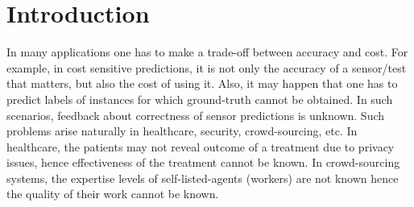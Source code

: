 \section{Introduction}
In many applications one has to make a trade-off between accuracy and cost. For example, in cost sensitive predictions, it is not only the accuracy of a sensor/test that matters, but also the cost of using it. Also, it may happen that one has to predict labels of instances for which ground-truth cannot be obtained. In such scenarios, feedback about correctness of sensor predictions is unknown. Such problems arise naturally in healthcare, security, crowd-sourcing, etc. In healthcare, the patients may not reveal outcome of a treatment due to privacy issues, hence effectiveness of the treatment cannot be known. In crowd-sourcing systems, the expertise levels of self-listed-agents (workers) are not known hence the quality of their work cannot be known. 

